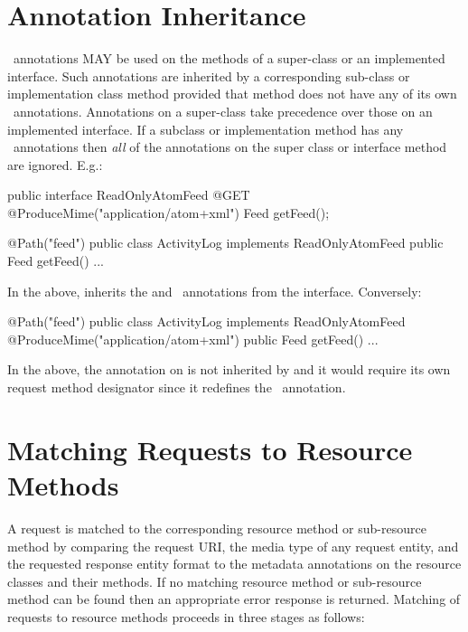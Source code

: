 \section{Annotation Inheritance}

\jaxrs\ annotations MAY be used on the methods of a super-class or an implemented interface. Such annotations are inherited by a corresponding sub-class or implementation class method provided that method does not have any of its own \jaxrs\ annotations. Annotations on a super-class take precedence over those on an implemented interface. If a subclass or implementation method has any \jaxrs\ annotations then {\em all} of the annotations on the super class or interface method are ignored. E.g.:

\begin{listing}{1}
public interface ReadOnlyAtomFeed {
  @GET @ProduceMime("application/atom+xml")
  Feed getFeed();
}

@Path("feed")
public class ActivityLog implements ReadOnlyAtomFeed {
  public Feed getFeed() {...}
}
\end{listing}

In the above,  inherits the  and \ProduceMime\ annotations from the interface. Conversely:

\begin{listing}{1}
@Path("feed")
public class ActivityLog implements ReadOnlyAtomFeed {
  @ProduceMime("application/atom+xml")
  public Feed getFeed() {...}
}
\end{listing}

In the above, the  annotation on  is not inherited by  and it would require its own request method designator since it redefines the \ProduceMime\ annotation.

\section{Matching Requests to Resource Methods}
\label{mapping_requests_to_java_methods}

A request is matched to the corresponding resource method or sub-resource method by comparing the request URI, the media type of any request entity, and the requested response entity format to the metadata annotations on the resource classes and their methods. If no matching resource method or sub-resource method can be found then an appropriate error response is returned. Matching of requests to resource methods proceeds in three stages as follows:

